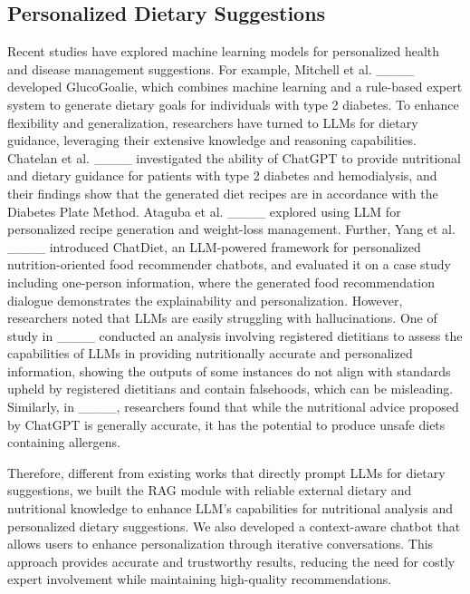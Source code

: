 \subsection{Personalized Dietary Suggestions}
Recent studies have explored machine learning models for personalized health and disease management suggestions. 
For example, Mitchell et al. ____ developed GlucoGoalie, which combines machine learning and a rule-based expert system to generate dietary goals for individuals with type 2 diabetes. 
To enhance flexibility and generalization, researchers have turned to LLMs for dietary guidance, leveraging their extensive knowledge and reasoning capabilities.
Chatelan et al. ____ investigated the ability of ChatGPT to provide nutritional and dietary guidance for patients with type 2 diabetes and hemodialysis, and their findings show that the generated diet recipes are in accordance with the Diabetes Plate Method. Ataguba et al. ____ explored using LLM for personalized recipe generation and weight-loss management. Further, Yang et al. ____ introduced ChatDiet, an LLM-powered framework for personalized nutrition-oriented food recommender chatbots, and evaluated it on a case study including one-person information, where the generated food recommendation dialogue demonstrates the explainability and personalization. 
However, researchers noted that LLMs are easily struggling with hallucinations. One of study in ____ conducted an analysis involving registered dietitians to assess the capabilities of LLMs in providing nutritionally accurate and personalized information, showing the outputs of some instances do not align with standards upheld by registered dietitians and contain falsehoods, which can be misleading.
Similarly, in ____, researchers found that while the nutritional advice proposed by ChatGPT is generally accurate, it has the potential to produce unsafe diets containing allergens.


Therefore, different from existing works that directly prompt LLMs for dietary suggestions, we built the RAG module with reliable external dietary and nutritional knowledge to enhance LLM's capabilities for nutritional analysis and personalized dietary suggestions. We also developed a context-aware chatbot that allows users to enhance personalization through iterative conversations.
This approach provides accurate and trustworthy results, reducing the need for costly expert involvement while maintaining high-quality recommendations.


